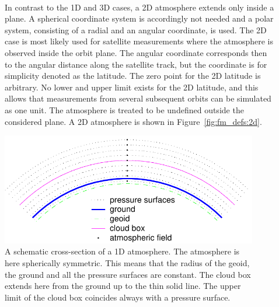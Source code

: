 \begin{description}
\item[\,\,\,] In contrast to the 1D and 3D cases, a 2D
  atmosphere extends only inside a plane. A spherical coordinate
  system is accordingly not needed and a polar system, consisting of a radial and an angular
  coordinate, is used. The 2D case is most likely used for satellite
  measurements where the atmosphere is observed inside the orbit
  plane. The angular coordinate corresponds then to the angular
  distance along the satellite track, but the coordinate is for
  simplicity denoted as the latitude. The zero point for the 2D
  latitude is arbitrary. No lower and upper limit exists for the 2D
  latitude, and this allows that measurements from several subsequent
  orbits can be simulated as one unit. The atmosphere is treated to be
  undefined outside the considered plane. A 2D atmosphere is shown in
  Figure~\ref{fig:fm_defs:2d}.

\end{description}

\begin{figure}[!t]
 \begin{center}
  \includegraphics*[width=0.95\hsize]{Figs/fm_definitions/atm_dim_1d}
  \caption{A schematic cross-section of a 1D atmosphere. The atmosphere is 
    here spherically symmetric. This means that the radius of the
    geoid, the ground and all the pressure surfaces are constant. The
    cloud box extends here from the ground up to the thin solid line. 
    The upper limit of the cloud box
    coincides always with a pressure surface. }
  \label{fig:fm_defs:1d}  
 \end{center}
\end{figure}

